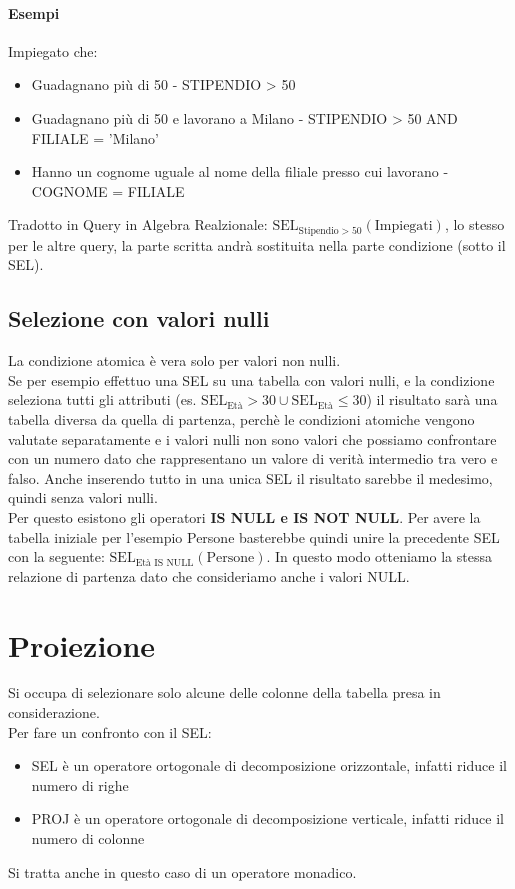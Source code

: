 \paragraph*{Esempi} Impiegato che:
\begin{itemize}
    \item Guadagnano più di 50 - STIPENDIO > 50
    \item Guadagnano più di 50 e lavorano a Milano - STIPENDIO > 50 AND FILIALE = 'Milano'
    \item Hanno un cognome uguale al nome della filiale presso cui lavorano - COGNOME = FILIALE
\end{itemize}
Tradotto in Query in Algebra Realzionale: $\text{SEL}_{\text{Stipendio} > 50}(\text{Impiegati})$,
lo stesso per le altre query, la parte scritta andrà sostituita nella parte condizione (sotto il SEL).
\subsection*{Selezione con valori nulli}
La condizione atomica è vera solo per valori non nulli.\\
Se per esempio effettuo una SEL su una tabella con valori nulli, e la condizione seleziona
tutti gli attributi (es. $\text{SEL}_\text{Età}>30 \cup \text{SEL}_\text{Età}\leq30$) 
il risultato sarà una tabella diversa da quella di partenza, perchè le condizioni atomiche
vengono valutate separatamente e i valori nulli non sono valori che possiamo confrontare con un numero
dato che rappresentano un valore di verità intermedio tra vero e falso. Anche inserendo tutto in una
unica SEL il risultato sarebbe il medesimo, quindi senza valori nulli. \\
Per questo esistono gli operatori \textbf{IS NULL e IS NOT NULL}. Per avere la tabella iniziale
per l'esempio Persone basterebbe quindi unire la precedente SEL con la seguente: 
$\text{SEL}_\text{Età IS NULL}(\text{Persone})$. In questo modo otteniamo la
stessa relazione di partenza dato che consideriamo anche i valori NULL.

\section{Proiezione}
Si occupa di selezionare solo alcune delle colonne della tabella presa in considerazione. \\
Per fare un confronto con il SEL:
\begin{itemize}
    \item SEL è un operatore ortogonale di decomposizione orizzontale, infatti
    riduce il numero di righe
    \item PROJ è un operatore ortogonale di decomposizione verticale, infatti
    riduce il numero di colonne
\end{itemize}
Si tratta anche in questo caso di un operatore monadico.
